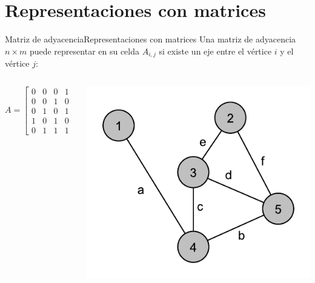 \documentclass[spanish, c]{beamer}
\begin{document}
\section{Representaciones con matrices}

\begin{frame}{Matriz de adyacencia}{Representaciones con matrices}
    Una matriz de \alert{adyacencia} $n \times m$ puede representar en su celda $A_{i,j}$ si existe un eje entre el vértice $i$ y el vértice $j$:

    \begin{columns}
        \begin{column}{0.5\textwidth}
            $$A = \begin{bmatrix}%
                0 & 0 & 0 & 1 & 0 \\
                0 & 0 & 1 & 0 & 1 \\
                0 & 1 & 0 & 1 & 1 \\
                1 & 0 & 1 & 0 & 1 \\
                0 & 1 & 1 & 1 & 0
            \end{bmatrix}$$
        \end{column}
        \begin{column}{0.5\textwidth}
            \includegraphics[width=\textwidth]{adj-inc.pdf}
        \end{column}
    \end{columns}
\end{frame}
\end{document}
